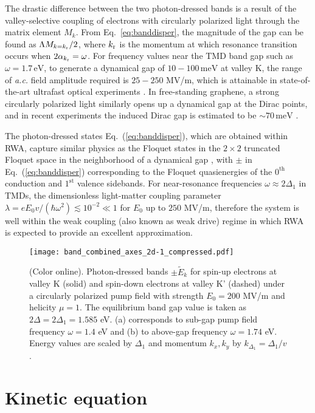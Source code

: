 \documentclass[reprint,amsmath,amssymb,aps,prb]{revtex4-1}
\begin{document}
The drastic difference between the two photon-dressed bands is a result of the valley-selective coupling of electrons with circularly polarized light through the matrix element $M_k$. From Eq.~\eqref{eq:banddisper}, the magnitude of the gap can be found as $\Lambda M_{k = k_{\rm r}}/2$, where $k_{\rm r}$ is the momentum at which resonance transition occurs when  $2\alpha_{k_{\rm r}} = \omega$. For frequency values near the TMD band gap such as $\omega = 1.7\,\mathrm{eV}$, to generate a {dynamical gap of  $10-100\,\mathrm{meV}$} at valley K, the range of \textit{a.c.} field amplitude required is $25-250$ MV/m, which is attainable in state-of-the-art ultrafast optical experiments \cite{sie2015valley,sim2016selectively,sie2017large}. In free-standing graphene, a strong circularly polarized light similarly opens up a dynamical gap at the Dirac points, and in recent experiments the induced Dirac gap is estimated to be $\sim 70\,\mathrm{meV}$ \cite{AHE_Exp7}.

The photon-dressed states Eq.~(\ref{eq:banddisper}), which are obtained within RWA, capture similar physics as the Floquet states in the $2\times 2$ truncated Floquet space in the neighborhood of a dynamical gap \cite{Floq_Band1,Floq_Band2,Floq_Band3}, with $\pm$ in Eq.~(\ref{eq:banddisper}) corresponding to the Floquet quasienergies of the $0^{\mathrm{th}}$ conduction and $1^{\mathrm{st}}$ valence sidebands. For near-resonance frequencies $\omega \approx 2\Delta_1$ in TMDs, the dimensionless light-matter coupling parameter $\lambda = eE_0 v/(\hbar\omega^2) \lesssim 10^{-2} \ll 1$ for $E_0$ up to $250$ MV/m, therefore the system is well within the  weak coupling (also known as weak drive) regime in which RWA is expected to provide an excellent approximation. 
%
\begin{figure}[hp!tb]
  \texttt{[image: band\_combined\_axes\_2d-1\_compressed.pdf]}
  \caption{(Color online). Photon-dressed bands $\pm\tilde{E}_k$ for spin-up electrons at valley K (solid) and spin-down electrons at valley K' (dashed) under a circularly polarized pump field with strength $E_0= 200$\; MV/m and helicity $\mu = 1$. The equilibrium band gap value is taken as $2\Delta = 2\Delta_1=1.585$ eV. (a) corresponds to sub-gap pump field frequency $\omega=1.4$ eV and (b) to above-gap frequency $\omega= 1.74$ eV. Energy values are scaled by $\Delta_1$ and momentum $k_x, k_y$ by $k_{\Delta_1}=\Delta_1/v$.} \label{Ek1}
\end{figure}

\section{Kinetic equation} \label{sec:QKE}
\end{document}

